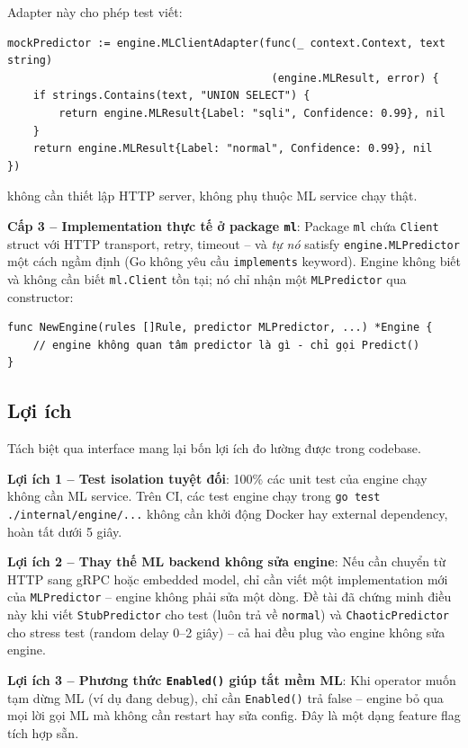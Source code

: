 \documentclass[../DoAn.tex]{subfiles}
\begin{document}
Adapter này cho phép test viết:

\begin{verbatim}
mockPredictor := engine.MLClientAdapter(func(_ context.Context, text string)
                                         (engine.MLResult, error) {
    if strings.Contains(text, "UNION SELECT") {
        return engine.MLResult{Label: "sqli", Confidence: 0.99}, nil
    }
    return engine.MLResult{Label: "normal", Confidence: 0.99}, nil
})
\end{verbatim}

không cần thiết lập HTTP server, không phụ thuộc ML service chạy thật.

\textbf{Cấp 3 -- Implementation thực tế ở package \texttt{ml}}: Package
\texttt{ml} chứa \texttt{Client} struct với HTTP transport, retry, timeout
-- và \textit{tự nó} satisfy \texttt{engine.MLPredictor} một cách ngầm
định (Go không yêu cầu \texttt{implements} keyword). Engine không biết và
không cần biết \texttt{ml.Client} tồn tại; nó chỉ nhận một
\texttt{MLPredictor} qua constructor:

\begin{verbatim}
func NewEngine(rules []Rule, predictor MLPredictor, ...) *Engine {
    // engine không quan tâm predictor là gì - chỉ gọi Predict()
}
\end{verbatim}

\subsection{Lợi ích}
\label{subsection:5.4.3}

Tách biệt qua interface mang lại bốn lợi ích đo lường được trong codebase.

\textbf{Lợi ích 1 -- Test isolation tuyệt đối}: 100\% các unit test của
engine chạy không cần ML service. Trên CI, các test engine chạy trong
\texttt{go test ./internal/engine/...} không cần khởi động Docker hay
external dependency, hoàn tất dưới 5 giây.

\textbf{Lợi ích 2 -- Thay thế ML backend không sửa engine}: Nếu cần
chuyển từ HTTP sang gRPC hoặc embedded model, chỉ cần viết một implementation
mới của \texttt{MLPredictor} -- engine không phải sửa một dòng. Đề tài
đã chứng minh điều này khi viết \texttt{StubPredictor} cho test (luôn trả
về \texttt{normal}) và \texttt{ChaoticPredictor} cho stress test (random
delay 0--2 giây) -- cả hai đều plug vào engine không sửa engine.

\textbf{Lợi ích 3 -- Phương thức \texttt{Enabled()} giúp tắt mềm ML}: Khi
operator muốn tạm dừng ML (ví dụ đang debug), chỉ cần \texttt{Enabled()}
trả false -- engine bỏ qua mọi lời gọi ML mà không cần restart hay sửa
config. Đây là một dạng feature flag tích hợp sẵn.
\end{document}
